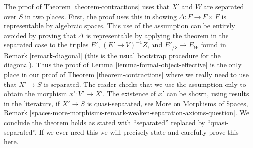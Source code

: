 \begin{remark}
\label{remark-separated-needed}
The proof of Theorem \ref{theorem-contractions} uses that $X'$ and $W$
are separated over $S$ in two places. First, the proof uses this in showing
$\Delta : F \to F \times F$ is representable by algebraic spaces.
This use of the assumption can be entirely avoided by proving
that $\Delta$ is representable by applying the theorem in the
separated case to the triples
$E'$, $(E' \to V)^{-1}Z$, and $E'_{/Z} \to E_W$
found in Remark \ref{remark-diagonal} (this is the usual bootstrap
procedure for the diagonal). Thus the proof of
Lemma \ref{lemma-formal-object-effective} is the only
place in our proof of Theorem \ref{theorem-contractions}
where we really need to use that $X' \to S$ is separated.
The reader checks that we use the assumption only to obtain
the morphism $x' : V' \to X'$. The existence of $x'$ can be shown,
using results in the literature, if $X' \to S$ is quasi-separated, see
More on Morphisms of Spaces, Remark
\ref{spaces-more-morphisms-remark-weaken-separation-axioms-question}.
We conclude the theorem holds as stated with
``separated'' replaced by ``quasi-separated''. If we ever need this
we will precisely state and carefully prove this here.
\end{remark}





















